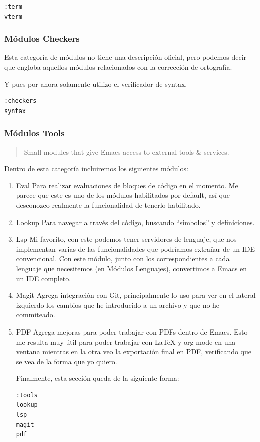 \documentclass[11pt]{article}
\begin{document}
\begin{verbatim}
:term
vterm

\end{verbatim}
\subsubsection{Módulos Checkers}
\label{sec:org0d291a1}

Esta categoría de módulos no tiene una descripción oficial, pero podemos decir que engloba aquellos módulos relacionados con la corrección de ortografía.

Y pues por ahora solamente utilizo el verificador de syntax.

\begin{verbatim}
:checkers
syntax

\end{verbatim}
\subsubsection{Módulos Tools}
\label{sec:orgc2fcaff}

\begin{quote}
Small modules that give Emacs access to external tools \& services.
\end{quote}

Dentro de esta categoría incluiremos los siguientes módulos:
\begin{enumerate}
\item Eval
\label{sec:orged9d9e7}
Para realizar evaluaciones de bloques de código en el momento. Me parece que este es uno de los módulos habilitados por default, así que desconozco realmente la funcionalidad de tenerlo habilitado.
\item Lookup
\label{sec:org897c1e8}
Para navegar a través del código, buscando ``símbolos'' y definiciones.
\item Lsp
\label{sec:org7cbbf1b}
Mi favorito, con este podemos tener servidores de lenguaje, que nos implementan varias de las funcionalidades que podríamos extrañar de un IDE convencional. Con este módulo, junto con los correspondientes a cada lenguaje que necesitemos (en Módulos Lenguajes), convertimos a Emacs en un IDE completo.
\item Magit
\label{sec:orgd6a7ce9}
Agrega integración con Git, principalmente lo uso para ver en el lateral izquierdo los cambios que he introducido a un archivo y que no he commiteado.
\item PDF
\label{sec:org8fd6035}
Agrega mejoras para poder trabajar con PDFs dentro de Emacs. Esto me resulta muy útil para poder trabajar con \LaTeX{} y org-mode en una ventana mientras en la otra veo la exportación final en PDF, verificando que se vea de la forma que yo quiero.

Finalmente, esta sección queda de la siguiente forma:

\begin{verbatim}
:tools
lookup
lsp
magit
pdf

\end{verbatim}
\end{enumerate}
\end{document}
